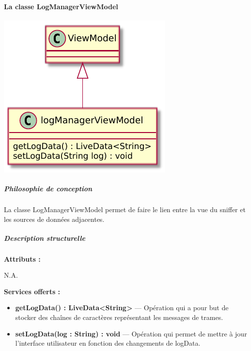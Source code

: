 \paragraph{La classe LogManagerViewModel}

\begin{minipage}
    {\linewidth}
    \centering
    \includegraphics[width=0.80\linewidth]{../schemas/Conception_detaillee/classe_logManagerViewModel.pdf}
\end{minipage}

\subparagraph{Philosophie de conception \newline} 

\medspace

La classe LogManagerViewModel permet de faire le lien entre la vue du sniffer et les sources de données adjacentes. 

\subparagraph{Description structurelle \newline}

\medspace

\textbf{Attributs :}

N.A.

\textbf{Services offerts :}

\begin{itemize}
    \item \textbf{getLogData() : LiveData<String>} --- Opération qui a pour but de stocker des chaînes de caractères représentant les messages de trames. 
    \item \textbf{setLogData(log : String) : void} --- Opération qui permet de mettre à jour l'interface utilisateur en fonction des changements de logData. 
\end{itemize}
